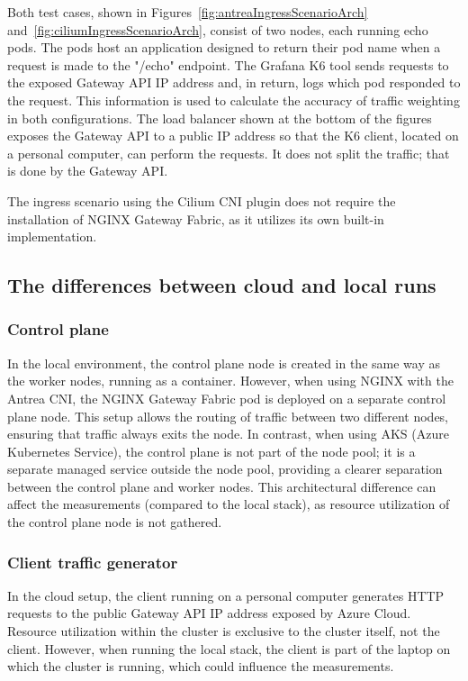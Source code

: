 Both test cases, shown in Figures~\ref{fig:antreaIngressScenarioArch} and~\ref{fig:ciliumIngressScenarioArch}, consist of two nodes, each running echo pods. The pods host an application designed to return their pod name when a request is made to the "/echo" endpoint. The Grafana K6 tool sends requests to the exposed Gateway API IP address and, in return, logs which pod responded to the request. This information is used to calculate the accuracy of traffic weighting in both configurations. The load balancer shown at the bottom of the figures exposes the Gateway API to a public IP address so that the K6 client, located on a personal computer, can perform the requests. It does not split the traffic; that is done by the Gateway API.

The ingress scenario using the Cilium CNI plugin does not require the installation of NGINX Gateway Fabric, as it utilizes its own built-in implementation.


\subsection{The differences between cloud and local runs}
\label{sec:diff}

\subsubsection{Control plane}
\label{sec:cplaneDiff}

In the local environment, the control plane node is created in the same way as the worker nodes, running as a container. However, when using NGINX with the Antrea CNI, the NGINX Gateway Fabric pod is deployed on a separate control plane node. This setup allows the routing of traffic between two different nodes, ensuring that traffic always exits the node. In contrast, when using AKS (Azure Kubernetes Service), the control plane is not part of the node pool; it is a separate managed service outside the node pool, providing a clearer separation between the control plane and worker nodes. This architectural difference can affect the measurements (compared to the local stack), as resource utilization of the control plane node is not gathered.

\subsubsection{Client traffic generator}
\label{sec:clientServerDiff}

In the cloud setup, the client running on a personal computer generates HTTP requests to the public Gateway API IP address exposed by Azure Cloud. Resource utilization within the cluster is exclusive to the cluster itself, not the client. However, when running the local stack, the client is part of the laptop on which the cluster is running, which could influence the measurements.
